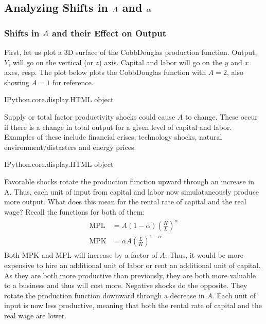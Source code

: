 \documentclass[letterpaper,10pt,english]{jupyterBook}
\begin{document}
\subsection{Analyzing Shifts in \protect\(A\protect\) and \protect\(\alpha\protect\)}
\label{\detokenize{content/04-production/shifts:analyzing-shifts-in-a-and-alpha}}\label{\detokenize{content/04-production/shifts::doc}}

\subsubsection{Shifts in \protect\(A\protect\) and their Effect on Output}
\label{\detokenize{content/04-production/shifts:shifts-in-a-and-their-effect-on-output}}
\sphinxAtStartPar
First, let us plot a 3D surface of the Cobb\sphinxhyphen{}Douglas production function. Output, \(Y\), will go on the vertical (or \(z\)) axis. Capital and labor will go on the \(y\) and \(x\) axes, resp. The plot below plots the Cobb\sphinxhyphen{}Douglas function with \(A=2\), also showing \(A=1\) for reference.

\begin{sphinxVerbatim}[commandchars=\\\{\}]
\PYGZlt{}IPython.core.display.HTML object\PYGZgt{}
\end{sphinxVerbatim}

\sphinxAtStartPar
Supply or total factor productivity shocks could cause \(A\) to change. These occur if there is a change in total output for a given level of capital and labor. Examples of these include financial crises, technology shocks, natural environment/distasters and energy prices.

\begin{sphinxVerbatim}[commandchars=\\\{\}]
\PYGZlt{}IPython.core.display.HTML object\PYGZgt{}
\end{sphinxVerbatim}

\sphinxAtStartPar
Favorable shocks rotate the production function upward through an increase in A. Thus, each unit of input from capital and labor now simulataneously produce more output. What does this mean for the rental rate of capital and the real wage? Recall the functions for both of them:
\begin{equation*}
\begin{split}\begin{aligned}
\text{MPL} &= A (1 - \alpha) \left ( \frac{K}{L} \right )^{\alpha} \\
\text{MPK} &= \alpha A \left ( \frac{L}{K} \right )^{1 - \alpha} 
\end{aligned}\end{split}
\end{equation*}
\sphinxAtStartPar
Both MPK and MPL will increase by a factor of \(A\). Thus, it would be more expensive to hire an additional unit of labor or rent an additional unit of capital. As they are both more productive than previously, they are both more valuable to a business and thus will cost more. Negative shocks do the opposite. They rotate the production function downward through a decrease in \(A\). Each unit of input is now less productive, meaning that both the rental rate of capital and the real wage are lower.
\end{document}
